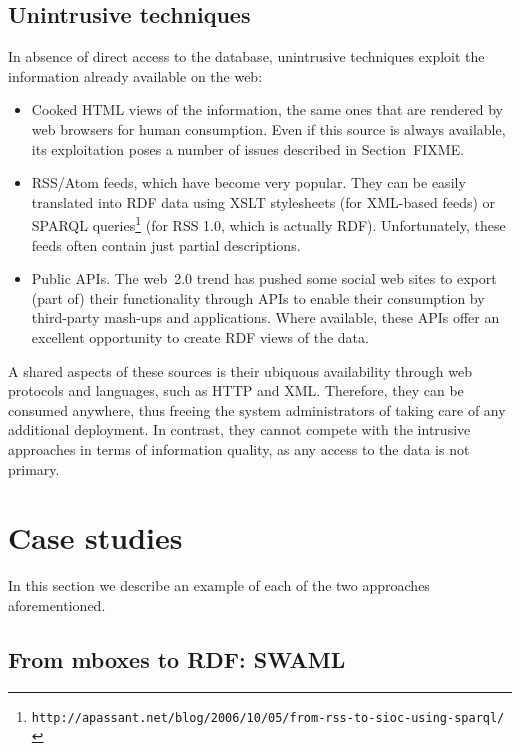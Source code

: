 \documentclass{../templates/www2008-submission}
\begin{document}
\subsection{Unintrusive techniques}

In absence of direct access to the database, unintrusive
techniques exploit the information already available on the web:

\begin{itemize}

\item Cooked HTML views of the information, the same ones that
are rendered by web browsers for human consumption.
Even if this source is always available,
its exploitation poses a number of issues described in Section~FIXME.

\item RSS/Atom feeds, which have become very popular. They can be easily
translated into RDF data using XSLT stylesheets (for XML-based feeds) or SPARQL queries\footnote{\texttt{http://apassant.net/blog/2006/10/05/from-rss-to-sioc-using-sparql/}}
(for RSS 1.0, which is actually RDF). Unfortunately,
these feeds often contain just partial descriptions.

\item Public APIs. The web~2.0 trend has pushed some social web
sites to export (part of) their functionality through APIs
to enable their consumption by third-party mash-ups and applications.
Where available, these APIs offer an excellent opportunity to
create RDF views of the data.

\end{itemize}

A shared aspects of these sources is their ubiquous availability through
web protocols and languages, such as HTTP and XML. Therefore, they
can be consumed anywhere, thus freeing the system administrators of
taking care of any additional deployment. In contrast, they cannot compete
with the intrusive approaches in terms of information quality, as
any access to the data is not primary.

\section{Case studies}

In this section we describe an example of each of the two approaches
aforementioned.

\subsection{From mboxes to RDF: SWAML}
\end{document}
